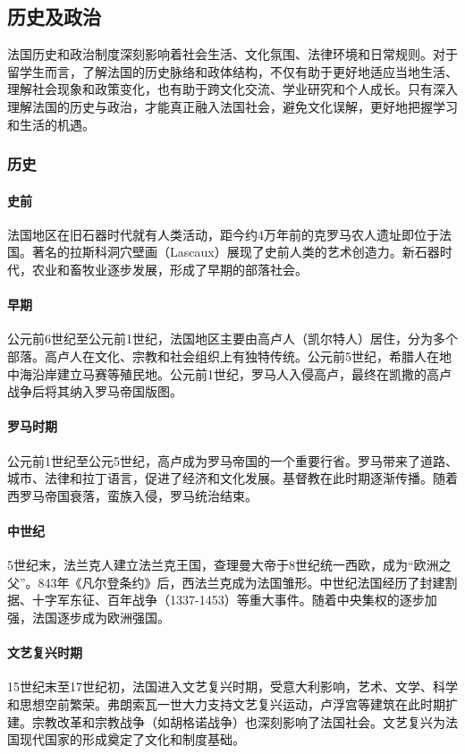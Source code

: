 \subsection{历史及政治}

法国历史和政治制度深刻影响着社会生活、文化氛围、法律环境和日常规则。对于留学生而言，了解法国的历史脉络和政体结构，不仅有助于更好地适应当地生活、理解社会现象和政策变化，也有助于跨文化交流、学业研究和个人成长。只有深入理解法国的历史与政治，才能真正融入法国社会，避免文化误解，更好地把握学习和生活的机遇。

\subsubsection{历史}

\paragraph{史前} 法国地区在旧石器时代就有人类活动，距今约4万年前的克罗马农人遗址即位于法国。著名的拉斯科洞穴壁画（Lascaux）展现了史前人类的艺术创造力。新石器时代，农业和畜牧业逐步发展，形成了早期的部落社会。

\paragraph{早期} 公元前6世纪至公元前1世纪，法国地区主要由高卢人（凯尔特人）居住，分为多个部落。高卢人在文化、宗教和社会组织上有独特传统。公元前5世纪，希腊人在地中海沿岸建立马赛等殖民地。公元前1世纪，罗马人入侵高卢，最终在凯撒的高卢战争后将其纳入罗马帝国版图。

\paragraph{罗马时期} 公元前1世纪至公元5世纪，高卢成为罗马帝国的一个重要行省。罗马带来了道路、城市、法律和拉丁语言，促进了经济和文化发展。基督教在此时期逐渐传播。随着西罗马帝国衰落，蛮族入侵，罗马统治结束。

\paragraph{中世纪} 5世纪末，法兰克人建立法兰克王国，查理曼大帝于8世纪统一西欧，成为“欧洲之父”。843年《凡尔登条约》后，西法兰克成为法国雏形。中世纪法国经历了封建割据、十字军东征、百年战争（1337-1453）等重大事件。随着中央集权的逐步加强，法国逐步成为欧洲强国。

\paragraph{文艺复兴时期} 15世纪末至17世纪初，法国进入文艺复兴时期，受意大利影响，艺术、文学、科学和思想空前繁荣。弗朗索瓦一世大力支持文艺复兴运动，卢浮宫等建筑在此时期扩建。宗教改革和宗教战争（如胡格诺战争）也深刻影响了法国社会。文艺复兴为法国现代国家的形成奠定了文化和制度基础。

